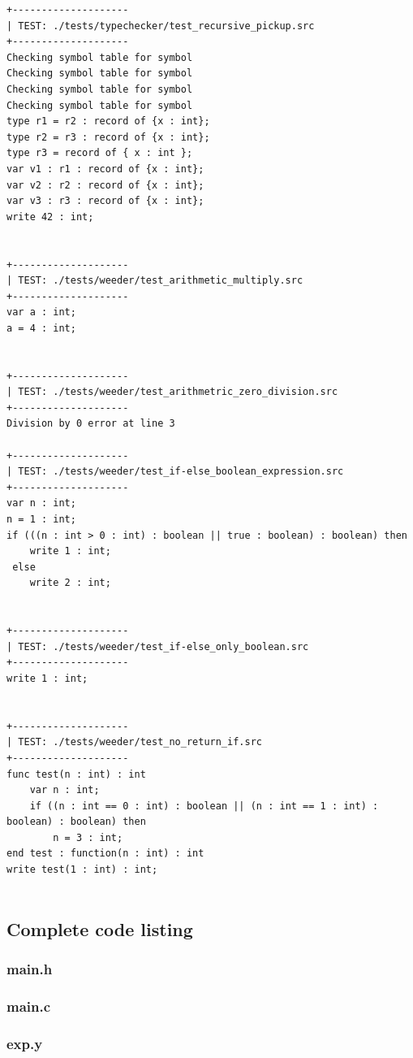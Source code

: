 \documentclass[a4paper,10pt,titlepage]{report}
\begin{document}
\begin{lstlisting}
+--------------------
| TEST: ./tests/typechecker/test_recursive_pickup.src
+--------------------
Checking symbol table for symbol
Checking symbol table for symbol
Checking symbol table for symbol
Checking symbol table for symbol
type r1 = r2 : record of {x : int};
type r2 = r3 : record of {x : int};
type r3 = record of { x : int };
var v1 : r1 : record of {x : int};
var v2 : r2 : record of {x : int};
var v3 : r3 : record of {x : int};
write 42 : int;

 
+--------------------
| TEST: ./tests/weeder/test_arithmetic_multiply.src
+--------------------
var a : int;
a = 4 : int;

 
+--------------------
| TEST: ./tests/weeder/test_arithmetric_zero_division.src
+--------------------
Division by 0 error at line 3
 
+--------------------
| TEST: ./tests/weeder/test_if-else_boolean_expression.src
+--------------------
var n : int;
n = 1 : int;
if (((n : int > 0 : int) : boolean || true : boolean) : boolean) then
    write 1 : int;
 else
    write 2 : int;

 
+--------------------
| TEST: ./tests/weeder/test_if-else_only_boolean.src
+--------------------
write 1 : int;

 
+--------------------
| TEST: ./tests/weeder/test_no_return_if.src
+--------------------
func test(n : int) : int
    var n : int;
    if ((n : int == 0 : int) : boolean || (n : int == 1 : int) : boolean) : boolean) then
        n = 3 : int;
end test : function(n : int) : int
write test(1 : int) : int;


\end{lstlisting}

\subsection{Complete code listing}

\subsubsection{main.h}


\subsubsection{main.c}


\subsubsection{exp.y}

\end{document}
